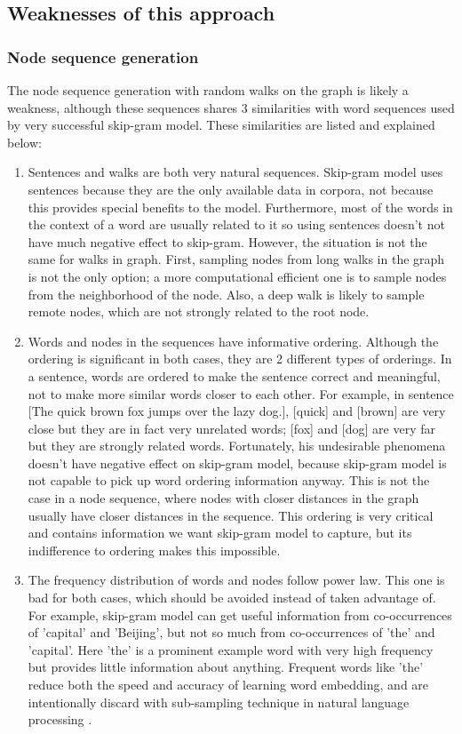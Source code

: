 \documentclass{article}
\begin{document}
\subsection{Weaknesses of this approach}

\subsubsection{Node sequence generation}

The node sequence generation with random walks on the graph is likely a weakness, although these sequences shares 3 similarities with word sequences used by very successful skip-gram model. These similarities are listed and explained below:
\begin{enumerate}
	\item Sentences and walks are both very natural sequences. Skip-gram model uses sentences because they are the only available data in corpora, not because this provides special benefits to the model. Furthermore, most of the words in the context of a word are usually related to it so using sentences doesn't not have much negative effect to skip-gram. However, the situation is not the same for walks in graph. First, sampling nodes from long walks in the graph is not the only option; a more computational efficient one is to sample nodes from the neighborhood of the node. Also, a deep walk is likely to sample remote nodes, which are not strongly related to the root node.
	\item Words and nodes in the sequences have informative ordering. Although the ordering is significant in both cases, they are 2 different types of orderings. In a sentence, words are ordered to make the sentence correct and meaningful, not to make more similar words closer to each other. For example, in sentence [The quick brown fox jumps over the lazy dog.], [quick] and [brown] are very close but they are in fact very unrelated words; [fox] and [dog] are very far but they are strongly related words. Fortunately, his undesirable phenomena doesn't have negative effect on skip-gram model, because skip-gram model is not capable to pick up word ordering information anyway. This is not the case in a node sequence, where nodes with closer distances in the graph usually have closer distances in the sequence. This ordering is very critical and contains information we want skip-gram model to capture, but its indifference to ordering makes this impossible.
	\item The frequency distribution of words and nodes follow power law. This one is bad for both cases, which should be avoided instead of taken advantage of. For example, skip-gram model can get useful information from co-occurrences of 'capital' and 'Beijing', but not so much from co-occurrences of 'the' and 'capital'. Here 'the' is a prominent example word with very high frequency but provides little information about anything. Frequent words like 'the' reduce both the speed and accuracy of learning word embedding, and are intentionally discard with sub-sampling technique in natural language processing \cite{mikolov2013distributed}.
\end{enumerate}
\end{document}
